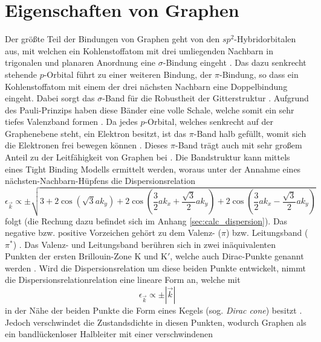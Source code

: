\section{Eigenschaften von Graphen}
\label{sec:propertiesofgraphene}
Der größte Teil der Bindungen von Graphen geht von den $sp^2$-Hybridorbitalen aus, mit welchen ein Kohlenstoffatom mit drei umliegenden
Nachbarn in trigonalen und planaren Anordnung eine $\sigma$-Bindung eingeht \cite{RevModPhys.81.109}.
Das dazu senkrecht stehende $p$-Orbital führt zu einer weiteren Bindung, der $\pi$-Bindung, so dass ein Kohlenstoffatom
mit einem der drei nächsten Nachbarn eine Doppelbindung eingeht.
Dabei sorgt das $\sigma$-Band für die Robustheit der Gitterstruktur \cite{RevModPhys.81.109}.
Aufgrund des Pauli-Prinzips haben diese Bänder eine volle Schale, welche somit ein sehr tiefes Valenzband
formen \cite{RevModPhys.81.109}.
Da jedes $p$-Orbital, welches senkrecht auf der Graphenebene steht, ein Elektron
besitzt, ist das $\pi$-Band halb gefüllt, womit sich die Elektronen frei bewegen können \cite{RevModPhys.81.109}\cite{graphene_properties}.
Dieses $\pi$-Band trägt auch mit sehr großem Anteil zu der Leitfähigkeit von Graphen bei \cite{graphene_properties}.
Die Bandstruktur kann mittels eines Tight Binding Modells ermittelt werden, woraus unter der Annahme eines nächsten-Nachbarn-Hüpfens
die Dispersionsrelation 
\begin{equation*}
    \epsilon_{\vec{k}} \propto \pm \sqrt{3+2 \cos \left ( \sqrt{3}ak_y \right )+2\cos \left ( \frac{3}{2}ak_x+\frac{\sqrt{3}}{2}ak_y \right ) + 2\cos \left ( \frac{3}{2}ak_x-\frac{\sqrt{3}}{2}ak_y \right ) }
\end{equation*}
folgt (die Rechung dazu befindet sich im Anhang \ref{sec:calc_dispersion}).
Das negative bzw. positive Vorzeichen gehört zu dem Valenz- ($\pi$) bzw. Leitungsband ($\pi^*$) \cite{RevModPhys.81.109}.
Das Valenz- und Leitungsband berühren sich in zwei inäquivalenten Punkten der ersten Brillouin-Zone K und $\text{K}'$, welche 
auch Dirac-Punkte genannt werden \cite{10.1093/nsr/nwu080}.
Wird die Dispersionsrelation um diese beiden Punkte entwickelt, nimmt die Dispersionsrelationrelation eine lineare Form an, welche mit 
\begin{equation}
    \epsilon_{\vec{k}} \propto \pm | \vec{k} | 
\end{equation}
in der Nähe der beiden Punkte die Form eines Kegels (sog. \textit{Dirac cone}) besitzt \cite{10.1093/nsr/nwu080}\cite{Avouris2007}.
Jedoch verschwindet die Zustandsdichte in diesen Punkten, wodurch Graphen als ein bandlückenloser Halbleiter mit einer verschwindenen 
